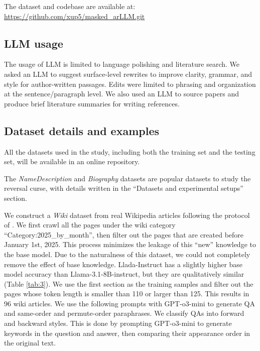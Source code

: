 The dataset and codebase are available at: 
\url{https://github.com/xup5/masked_arLLM.git}


\subsection{LLM usage}
 
The usage of LLM is limited to language polishing and literature search. We asked an LLM to suggest surface-level rewrites to improve clarity, grammar, and style for author-written passages. Edits were limited to phrasing and organization at the sentence/paragraph level. We also used an LLM to source papers and produce brief literature summaries for writing references.

\subsection{Dataset details and examples}
\label{app:dataset}

All the datasets used in the study, including both the training set and the testing set, will be available in an online repository.

The \textit{NameDescription} and \textit{Biography} datasets are popular datasets to study the reversal curse, with details written in the ``Datasets and experimental setups'' section.

We construct a \textit{Wiki} dataset from real Wikipedia articles following the protocol of \cite{pan2025memorization}. We first crawl all the pages under the wiki category ``Category:2025\_by\_month'', then filter out the pages that are created before January 1st, 2025. This process minimizes the leakage of this ``new'' knowledge to the base model. Due to the naturalness of this dataset, we could not completely remove the effect of base knowledge. Llada-Instruct has a slightly higher base model accuracy than Llama-3.1-8B-instruct, but they are qualitatively similar (Table \ref{tab:3}). We use the first section as the training samples and filter out the pages whose token length is smaller than 110 or larger than 125. This results in 96 wiki articles. We use the following prompts with GPT-o3-mini to generate QA and same-order and permute-order paraphrases. We classify QAs into forward and backward styles. This is done by prompting GPT-o3-mini to generate keywords in the question and answer, then comparing their appearance order in the original text.
\newpage

